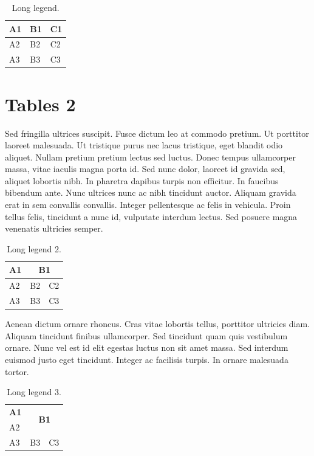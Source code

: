 \documentclass{article}
\begin{document}
	\begin{table}[H]
		\centering
		\caption[Short Legend]{Long legend.}
		\label{tab:tab1}
		\begin{tabular}{l | l | l}
			\textbf{A1} & \textbf{B1} & \textbf{C1} \\
			\hline
			A2          & B2          & C2          \\
			A3          & B3          & C3         
		\end{tabular}
	\end{table}

	\section{Tables 2}
	
	Sed fringilla ultrices suscipit. Fusce dictum leo at commodo pretium. Ut porttitor laoreet malesuada. Ut tristique purus nec lacus tristique, eget blandit odio aliquet. Nullam pretium pretium lectus sed luctus. Donec tempus ullamcorper massa, vitae iaculis magna porta id. Sed nunc dolor, laoreet id gravida sed, aliquet lobortis nibh. In pharetra dapibus turpis non efficitur. In faucibus bibendum ante. Nunc ultrices nunc ac nibh tincidunt auctor. Aliquam gravida erat in sem convallis convallis. Integer pellentesque ac felis in vehicula. Proin tellus felis, tincidunt a nunc id, vulputate interdum lectus. Sed posuere magna venenatis ultricies semper.
	
	\begin{table}[H]
		\centering
		\caption[Short Legend 2]{Long legend 2.}
		\label{tab:tab2}
		\begin{tabular}{l | l | l}
			\textbf{A1} & \multicolumn{2}{c}{\textbf{B1}} \\
			\hline
			A2          & B2          & C2          \\
			A3          & B3          & C3         
		\end{tabular}
	\end{table}

	Aenean dictum ornare rhoncus. Cras vitae lobortis tellus, porttitor ultricies diam. Aliquam tincidunt finibus ullamcorper. Sed tincidunt quam quis vestibulum ornare. Nunc vel est id elit egestas luctus non sit amet massa. Sed interdum euismod justo eget tincidunt. Integer ac facilisis turpis. In ornare malesuada tortor.

	\begin{table}[H]
		\centering
		\caption[Short Legend 3]{Long legend 3.}
		\label{tab:tab3}
		\begin{tabular}{l | l | l}
			\textbf{A1} & \multicolumn{2}{c}{\multirow{2}{*}{\textbf{B1}}} \\
			\cline{1-1}
			A2          & \multicolumn{2}{l}{}                             \\
			\cline{1-3}
			A3          & B3                      & C3
		\end{tabular}
	\end{table}
\end{document}
